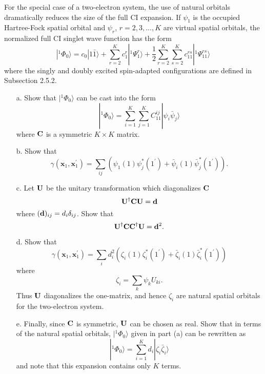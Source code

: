 \documentclass[a4paper]{book}
\newcommand{\C}{{\bf C}}
\newcommand{\U}{{\bf U}}
\begin{document}
	\begin{exercise}
	For the special case of a two-electron system, the use of natural orbitals dramatically reduces the size of the full CI expansion. If $\psi_1$ is the occupied Hartree-Fock spatial orbital and $\psi_r$, $r=2,3,...,K$ are virtual spatial orbitals, the normalized full CI singlet wave function has the form
	\[
		|{}^{1}\Phi_0 \rangle = c_0 |1\bar{1}\rangle + \sum_{r=2}^K c^r_1 | {}^{1} \Psi^r_1 \rangle + \frac{1}{2} \sum_{r=2}^K \sum_{s=2}^K c^{rs}_{11} | {}^{1} \Psi^{rs}_{11} \rangle
	\]
	where the singly and doubly excited spin-adapted configurations are defined in Subsection 2.5.2.
	
	\begin{enumerate}
	
	\item[a.] Show that $|{}^{1}\Phi_0 \rangle$	can be cast into the form
	\[
		|{}^{1}\Phi_0 \rangle = \sum_{i=1}^K \sum_{j=1}^K C^{ij}_{11} | \psi_i \bar{\psi}_j \rangle
	\]
	where $\C$ is a symmetric $K \times K$ matrix.
	
	\item[b.] Show that
	\[
		\gamma( \boldsymbol{x}_1 , \boldsymbol{x}_1^\prime ) = \sum_{ij} \left( \psi_1(1) \psi^*_j(1^\prime) + \bar{\psi}_i (1) \bar{\psi}_j^* (1^\prime) \right).
	\]
	
	\item[c.] Let $\U$ be the unitary transformation which diagonalizes $\C$
	\[
		\U^\dagger \C \U = {\bf d}
	\]
	where $({\bf d})_{ij} = d_i \delta_{ij}$. Show that
	\[
		\U^\dagger \C \C^\dagger \U = {\bf d}^2.
	\]
	
	\item[d.] Show that
	\[
		\gamma( \boldsymbol{x}_1 , \boldsymbol{x}_1^\prime ) = \sum_i d^2_i \left( \zeta_i(1)\zeta^*_i(1^\prime) + \bar{\zeta}_i(1) \bar{\zeta}^*_i (1^\prime) \right)
	\]
	where
	\[
		\zeta_i = \sum_k \psi_k U_{ki}.
	\]
	Thus $\U$ diagonalizes the one-matrix, and hence $\zeta_i$ are natural spatial orbitals for the two-electron system.
	
	\item[e.] Finally, since $\C$ is symmetric, $\U$ can be chosen as real. Show that in terms of the natural spatial orbitals, $| {}^{1} \Phi_0 \rangle$ given in part (a) can be rewritten as
	\[
		| {}^{1} \Phi_0 \rangle = \sum_{i=1}^K d_i | \zeta_i \bar{\zeta}_i \rangle
	\]
	and note that this expansion contains only $K$ terms.
	\end{enumerate}
	\end{exercise}
	
\end{document}
